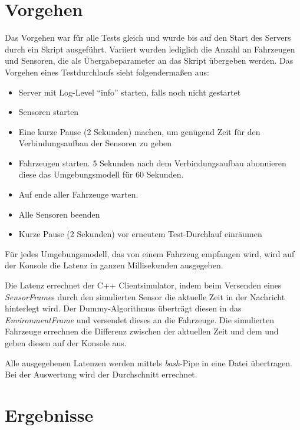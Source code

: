 

\section{Vorgehen}

Das Vorgehen war für alle Tests gleich und wurde bis auf den Start des Servers durch ein Skript ausgeführt.
Variiert wurden lediglich die Anzahl an Fahrzeugen und Sensoren, die als Übergabeparameter an das Skript übergeben werden.
Das Vorgehen eines Testdurchlaufs sieht folgendermaßen aus:

\begin{itemize}
	\item Server mit Log-Level \enquote{info} starten, falls noch nicht gestartet
	\item Sensoren starten
	\item Eine kurze Pause (2 Sekunden) machen, um genügend Zeit für den Verbindungsaufbau der Sensoren zu geben
	\item Fahrzeugen starten. 5 Sekunden nach dem Verbindungsaufbau abonnieren diese das Umgebungsmodell für 60 Sekunden.
	\item Auf ende aller Fahrzeuge warten.
	\item Alle Sensoren beenden
	\item Kurze Pause (2 Sekunden) vor erneutem Test-Durchlauf einräumen
\end{itemize}

Für jedes Umgebungsmodell, das von einem Fahrzeug empfangen wird, wird auf der Konsole die Latenz in ganzen Millisekunden ausgegeben.

Die Latenz errechnet der C++ Clientsimulator, indem beim Versenden eines \textit{SensorFrame}s durch den simulierten Sensor die aktuelle Zeit in der Nachricht hinterlegt wird.
Der Dummy-Algorithmus überträgt diesen  in das \textit{EnvironmentFrame} und versendet dieses an die Fahrzeuge.
Die simulierten Fahrzeuge errechnen die Differenz zwischen der aktuellen Zeit und dem 
 und geben diesen auf der Konsole aus.
 
Alle ausgegebenen Latenzen werden mittels \textit{bash}-Pipe in eine Datei übertragen.
Bei der Auswertung wird der Durchschnitt errechnet.

\section{Ergebnisse}

